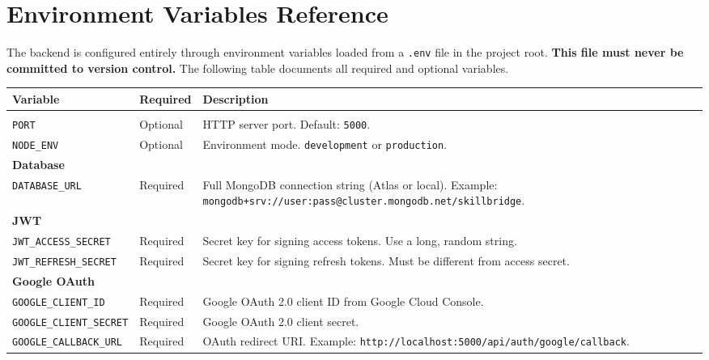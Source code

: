 \chapter{Environment Variables Reference}
\label{app:env}

The \projectname{} backend is configured entirely through environment variables loaded from a \texttt{.env} file in the project root. \textbf{This file must never be committed to version control.} The following table documents all required and optional variables.

\begin{longtable}{p{5.5cm} p{3cm} p{6cm}}
\toprule
\textbf{Variable} & \textbf{Required} & \textbf{Description} \\
\midrule
\endhead
\bottomrule
\endfoot

\multicolumn{3}{l}{\textbf{Server}} \\[4pt]
\texttt{PORT}                    & Optional  & HTTP server port. Default: \texttt{5000}. \\
\texttt{NODE\_ENV}               & Optional  & Environment mode. \texttt{development} or \texttt{production}. \\[8pt]

\multicolumn{3}{l}{\textbf{Database}} \\[4pt]
\texttt{DATABASE\_URL}           & Required  & Full MongoDB connection string (Atlas or local). Example: \texttt{mongodb+srv://user:pass@cluster.mongodb.net/skillbridge}. \\[8pt]

\multicolumn{3}{l}{\textbf{JWT}} \\[4pt]
\texttt{JWT\_ACCESS\_SECRET}     & Required  & Secret key for signing access tokens. Use a long, random string. \\
\texttt{JWT\_REFRESH\_SECRET}    & Required  & Secret key for signing refresh tokens. Must be different from access secret. \\[8pt]

\multicolumn{3}{l}{\textbf{Google OAuth}} \\[4pt]
\texttt{GOOGLE\_CLIENT\_ID}      & Required  & Google OAuth 2.0 client ID from Google Cloud Console. \\
\texttt{GOOGLE\_CLIENT\_SECRET}  & Required  & Google OAuth 2.0 client secret. \\
\texttt{GOOGLE\_CALLBACK\_URL}   & Required  & OAuth redirect URI. Example: \texttt{http://localhost:5000/api/auth/google/callback}. \\[8pt]


\end{longtable}
